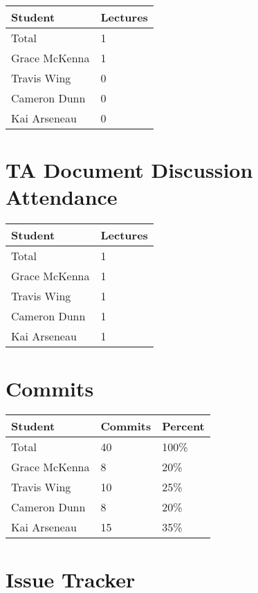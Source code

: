 \documentclass{article}
\begin{document}
\begin{table}[H]
\centering
\begin{tabular}{ll}
\toprule
\textbf{Student} & \textbf{Lectures}\\
\midrule
Total & 1\\
Grace McKenna & 1\\
Travis Wing & 0\\
Cameron Dunn & 0\\
Kai Arseneau & 0\\
\bottomrule
\end{tabular}
\end{table}


\section{TA Document Discussion Attendance}


\begin{table}[H]
\centering
\begin{tabular}{ll}
\toprule
\textbf{Student} & \textbf{Lectures}\\
\midrule
Total & 1\\
Grace McKenna & 1\\
Travis Wing & 1\\
Cameron Dunn & 1\\
Kai Arseneau & 1\\
\bottomrule
\end{tabular}
\end{table}


\section{Commits}

\begin{table}[H]
\centering
\begin{tabular}{lll}
\toprule
\textbf{Student} & \textbf{Commits} & \textbf{Percent}\\
\midrule
Total & 40 & 100\% \\
Grace McKenna & 8 & 20\% \\
Travis Wing & 10 & 25\% \\
Cameron Dunn & 8 & 20\% \\
Kai Arseneau & 15 & 35\% \\
\bottomrule
\end{tabular}
\end{table}


\section{Issue Tracker}
\end{document}
